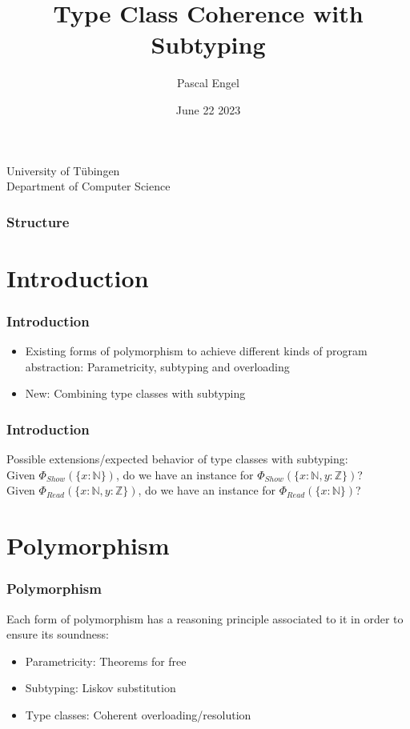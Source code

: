 \documentclass{beamer}
\title{Type Class Coherence with Subtyping}
\author{Pascal Engel}
\date{June 22 2023}
\newcommand\Nat{\mathbb{N}}
\newcommand\Int{\mathbb{Z}}
\begin{document}
\begin{frame}
  \centering
  University of T\"ubingen\\
  Department of Computer Science\\
  \maketitle
\end{frame}

\begin{frame}
  \frametitle{Structure}
  \tableofcontents
\end{frame}

\section{Introduction}

\begin{frame}
  \frametitle{Introduction}

  \begin{itemize}
    \item Existing forms of polymorphism to achieve different kinds of program abstraction: Parametricity, subtyping and overloading
    \item New: Combining type classes with subtyping
  \end{itemize}
\end{frame}

\begin{frame}
  \frametitle{Introduction}

  Possible extensions/expected behavior of type classes with subtyping:
  \\

  \pause
  Given $\Phi_{\mathit{Show}}(\{ x : \Nat \})$, do we have an instance for $\Phi_{\mathit{Show}}(\{ x : \Nat, y : \Int \})$?
  \\

  \pause
  Given $\Phi_{\mathit{Read}}(\{ x : \Nat, y : \Int \})$, do we have an instance for  $\Phi_{\mathit{Read}}(\{ x : \Nat \})$?
\end{frame}

\section{Polymorphism}

\begin{frame}
  \frametitle{Polymorphism}

  Each form of polymorphism has a reasoning principle associated to it in order to ensure its soundness:
  \begin{itemize}
    \item Parametricity: Theorems for free \cite{wadlertheorems}
    \item Subtyping: Liskov substitution \cite{liskov}
    \item Type classes: Coherent overloading/resolution \cite{reynolds_coherence}
  \end{itemize}
\end{frame}
\end{document}
